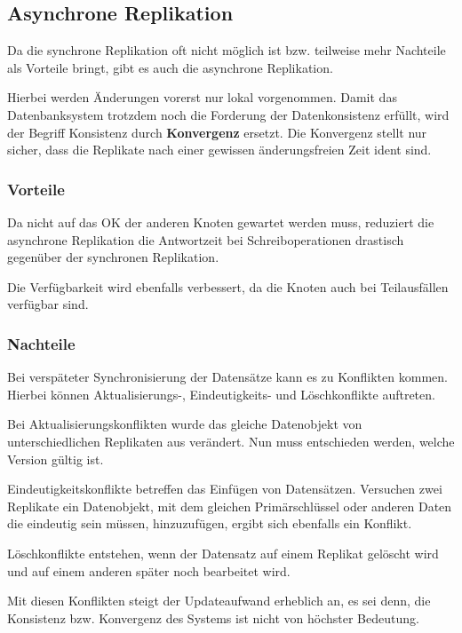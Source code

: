 \subsection{Asynchrone Replikation}

Da die synchrone Replikation oft nicht möglich ist bzw. teilweise mehr Nachteile als Vorteile bringt, gibt es auch die asynchrone Replikation.

Hierbei werden Änderungen vorerst nur lokal vorgenommen. Damit das Datenbanksystem trotzdem noch die Forderung der Datenkonsistenz erfüllt, wird der Begriff Konsistenz durch \textbf{Konvergenz} ersetzt. Die Konvergenz stellt nur sicher, dass die Replikate nach einer gewissen änderungsfreien Zeit ident sind. \cite{kaiserslautern}

\subsubsection{Vorteile}

Da nicht auf das OK der anderen Knoten gewartet werden muss, reduziert die asynchrone Replikation die Antwortzeit bei Schreiboperationen drastisch gegenüber der synchronen Replikation. \cite{kaiserslautern}

Die Verfügbarkeit wird ebenfalls verbessert, da die Knoten auch bei Teilausfällen verfügbar sind.

\subsubsection{Nachteile}

Bei verspäteter Synchronisierung der Datensätze kann es zu Konflikten kommen. Hierbei können Aktualisierungs-, Eindeutigkeits- und Löschkonflikte auftreten.

Bei Aktualisierungskonflikten wurde das gleiche Datenobjekt von unterschiedlichen Replikaten aus verändert. Nun muss entschieden werden, welche Version gültig ist. \cite{darmstadt}

Eindeutigkeitskonflikte betreffen das Einfügen von Datensätzen. Versuchen zwei Replikate ein Datenobjekt, mit dem gleichen Primärschlüssel oder anderen Daten die eindeutig sein müssen, hinzuzufügen, ergibt sich ebenfalls ein Konflikt. \cite{darmstadt}

Löschkonflikte entstehen, wenn der Datensatz auf einem Replikat gelöscht wird und auf einem anderen später noch bearbeitet wird. \cite{darmstadt}

Mit diesen Konflikten steigt der Updateaufwand erheblich an, es sei denn, die Konsistenz bzw. Konvergenz des Systems ist nicht von höchster Bedeutung.


